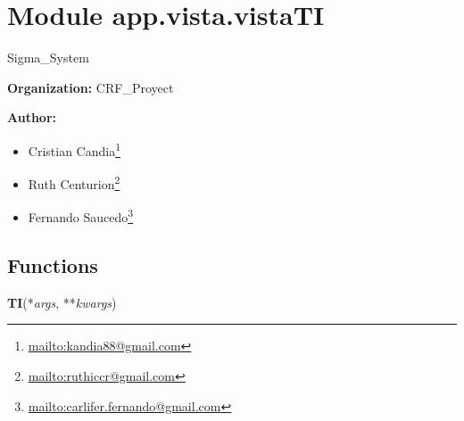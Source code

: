 %
%
%


\section{Module app.vista.vistaTI}

    \label{app:vista:vistaTI}
Sigma\_System

\textbf{Organization:} CRF\_Proyect



\textbf{Author:} \begin{itemize}
\setlength{\parskip}{0.6ex}
  \item Cristian 
    Candia\footnote{\href{mailto:kandia88@gmail.com}{mailto:kandia88@gmail.com}}

  \item Ruth 
    Centurion\footnote{\href{mailto:ruthiccr@gmail.com}{mailto:ruthiccr@gmail.com}}

  \item Fernando 
    Saucedo\footnote{\href{mailto:carlifer.fernando@gmail.com}{mailto:carlifer.fernando@gmail.com}}

\end{itemize}





  \subsection{Functions}

    \label{app:vista:vistaTI:TI}

    \vspace{0.5ex}

\hspace{.8\funcindent}\begin{boxedminipage}{\funcwidth}

    \raggedright \textbf{TI}(*\textit{args}, **\textit{kwargs})

\setlength{\parskip}{2ex}
\setlength{\parskip}{1ex}
    \end{boxedminipage}

